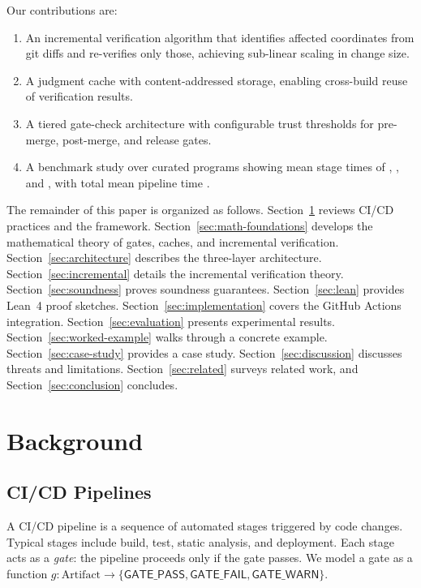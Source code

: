 \documentclass[11pt]{article}
\newcommand{\GatePass}{\mathsf{GATE\_PASS}}
\newcommand{\GateFail}{\mathsf{GATE\_FAIL}}
\newcommand{\GateWarn}{\mathsf{GATE\_WARN}}
\begin{document}
Our contributions are:
\begin{enumerate}[leftmargin=*]
  \item An incremental verification algorithm that identifies affected
        coordinates from git diffs and re-verifies only those, achieving
        sub-linear scaling in change size.
  \item A judgment cache with content-addressed storage, enabling cross-build
        reuse of verification results.
  \item A tiered gate-check architecture with configurable trust thresholds
        for pre-merge, post-merge, and release gates.
  \item A benchmark study over \ppLXVprogramCount{} curated programs showing
        mean stage times of \ppLXVpreMean{}, \ppLXVpostMean{}, and
        \ppLXVreleaseMean{}, with total mean pipeline time
        \ppLXVtotalMean{}.
\end{enumerate}

The remainder of this paper is organized as follows.
Section~\ref{sec:background} reviews CI/CD practices and the \JuGeo{}
framework. Section~\ref{sec:math-foundations} develops the mathematical
theory of gates, caches, and incremental verification.
Section~\ref{sec:architecture} describes the three-layer architecture.
Section~\ref{sec:incremental} details the incremental verification theory.
Section~\ref{sec:soundness} proves soundness guarantees.
Section~\ref{sec:lean} provides Lean~4 proof sketches.
Section~\ref{sec:implementation} covers the GitHub Actions integration.
Section~\ref{sec:evaluation} presents experimental results.
Section~\ref{sec:worked-example} walks through a concrete example.
Section~\ref{sec:case-study} provides a case study.
Section~\ref{sec:discussion} discusses threats and limitations.
Section~\ref{sec:related} surveys related work, and
Section~\ref{sec:conclusion} concludes.

\section{Background}\label{sec:background}

\subsection{CI/CD Pipelines}

A CI/CD pipeline is a sequence of automated stages triggered by code changes.
Typical stages include build, test, static analysis, and deployment. Each stage
acts as a \emph{gate}: the pipeline proceeds only if the gate passes. We model
a gate as a function $g : \text{Artifact} \to \{\GatePass, \GateFail,
\GateWarn\}$.
\end{document}
